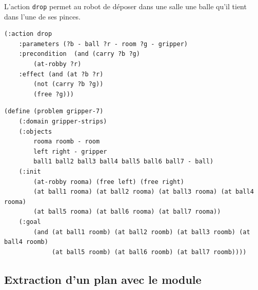 \noindent L'action \texttt{drop} permet au robot de déposer dans une salle une balle qu'il tient dans l'une de ses pinces.

\begin{lstlisting}[language=pddl,frame=single]
(:action drop
    :parameters (?b - ball ?r - room ?g - gripper)
    :precondition  (and (carry ?b ?g)
        (at-robby ?r)
    :effect (and (at ?b ?r)
        (not (carry ?b ?g)) 
        (free ?g)))
\end{lstlisting}



\begin{lstlisting}[language=pddl,frame=single]
(define (problem gripper-7)
    (:domain gripper-strips)
    (:objects
        rooma roomb - room
        left right - gripper
        ball1 ball2 ball3 ball4 ball5 ball6 ball7 - ball)
    (:init
        (at-robby rooma) (free left) (free right)
        (at ball1 rooma) (at ball2 rooma) (at ball3 rooma) (at ball4 rooma)
        (at ball5 rooma) (at ball6 rooma) (at ball7 rooma))
    (:goal
        (and (at ball1 roomb) (at ball2 roomb) (at ball3 roomb) (at ball4 roomb)
             (at ball5 roomb) (at ball6 roomb) (at ball7 roomb))))
\end{lstlisting}


\subsection{Extraction d'un plan avec le module \touistplan}


%
%

